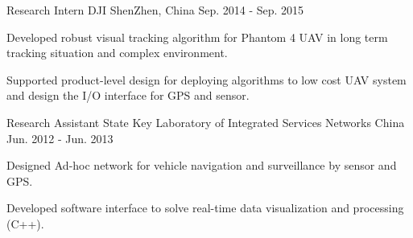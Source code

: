 \begin{cventries}
  \cventry
    {Research Intern} %
    {DJI} %
    {ShenZhen, China} %
    {Sep. 2014 - Sep. 2015} %
    {
      \begin{cvitems} %
        \item {Developed robust visual tracking algorithm for Phantom 4 UAV in long term tracking situation and complex environment.}
        \item {Supported product-level design for deploying algorithms to low cost UAV system and design the I/O interface for GPS and sensor.}
      \end{cvitems}
    }

  \cventry
    {Research Assistant} %
    {State Key Laboratory of Integrated Services Networks} %
    {China} %
    {Jun. 2012 - Jun. 2013} %
    {
      \begin{cvitems} %
        \item {Designed Ad-hoc network for vehicle navigation and surveillance by sensor and GPS.}
        \item {Developed software interface to solve real-time data visualization and processing (C++).}
      \end{cvitems}
    }

\end{cventries}
